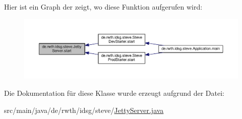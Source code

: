 Hier ist ein Graph der zeigt, wo diese Funktion aufgerufen wird\+:\nopagebreak
\begin{figure}[H]
\begin{center}
\leavevmode
\includegraphics[width=350pt]{classde_1_1rwth_1_1idsg_1_1steve_1_1_jetty_server_a8ef6c91015dbe98a901f843d583f1685_icgraph}
\end{center}
\end{figure}




Die Dokumentation für diese Klasse wurde erzeugt aufgrund der Datei\+:\begin{DoxyCompactItemize}
\item 
src/main/java/de/rwth/idsg/steve/\hyperlink{_jetty_server_8java}{Jetty\+Server.\+java}\end{DoxyCompactItemize}
